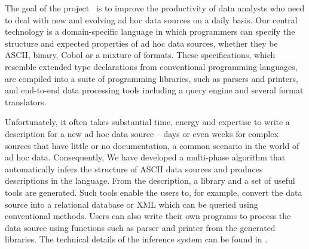 \documentclass{sig-alternate-sigmod08}
\begin{document}
The goal of the \pads{} project~\cite{padsweb} is to improve the
productivity of data analysts who need to deal with new and evolving
ad hoc data sources on a daily basis.  Our central technology is a
domain-specific language in which programmers can specify the
structure and expected properties of ad hoc data sources, whether they
be ASCII, binary, Cobol or a mixture of formats.  These
specifications, which resemble extended type declarations from
conventional programming languages, are compiled into a suite of
programming libraries, such as parsers and printers, and 
end-to-end data processing tools including a query engine
and several format translators.

Unfortunately, it often takes substantial time, energy and expertise
to write a \pads{} description for a new ad hoc data source
-- days or even weeks for complex sources that have little or
no documentation, a common scenario in the world of ad hoc data.
Consequently, We have developed a multi-phase algorithm that automatically
infers the structure of ASCII data sources and produces descriptions
in the \pads{} language. From the \pads{} description, a library and a
set of useful tools are generated. Such tools enable the users to, for example, 
convert the data source into a relational database or XML which can 
be queried using conventional methods. Users can also write their 
own programs to process the data source using
functions such as parser and printer from the generated libraries.
The technical details of the inference system can be found in
\cite{Fisher+:dirttoshovels}.


\end{document}
